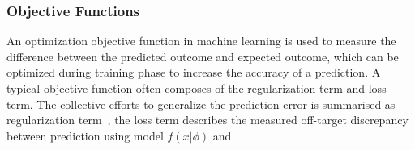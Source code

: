 \subsubsection{Objective Functions}
An optimization objective function in machine learning is used to measure the difference between the predicted outcome and expected outcome, which can be optimized during training phase to increase the accuracy of a prediction. A typical objective function often composes of the regularization term and loss term. The collective efforts to generalize the prediction error is summarised as regularization term~\cite{goodfellow_2015}, the loss term describes the measured off-target discrepancy between prediction using model $f(x|\phi)$ and 